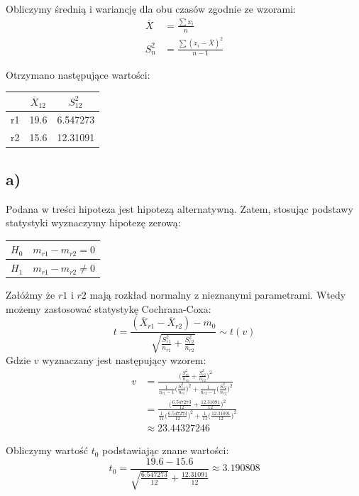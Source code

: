 \documentclass{article}
\begin{document}
Obliczymy średnią i wariancję dla obu czasów zgodnie ze wzorami:
\begin{align*}
\overline{X} & = \frac{\sum x_i}{n} \\
S_n^2 &= \frac{\sum (x_i - \overline{X})^2 }{n-1}
\end{align*}

Otrzymano następujące wartości:
\begin{center} \begin{tabular}{|c|c|c|} \hline
 & $\overline{X}_{12}$ & $S_{12}^2$ \\ \hline
r1 & 19.6 & 6.547273 \\ \hline
r2 & 15.6 & 12.31091 \\ \hline
\end{tabular} \end{center}

\subsection{a)}
Podana w treści hipoteza jest hipotezą alternatywną. Zatem, stosując podstawy statystyki wyznaczymy hipotezę zerową:
\begin{center} \begin{tabular}{|c|c|} \hline
$H_0$ & $m_{r1} - m_{r2} = 0$ \\ \hline
$H_1$ & $m_{r1} - m_{r2} \neq 0$ \\ \hline
\end{tabular} \end{center}

Załóżmy że $r1$ i $r2$ mają rozkład normalny z nieznanymi parametrami. Wtedy możemy zastosować statystykę Cochrana-Coxa:
\[ t = \frac{(\overline{X}_{r1} - \overline{X}_{r2}) - m_0}{\sqrt{ \frac{S_{r1}^2}{n_{r1}} + \frac{S_{r2}^2}{n_{r2}} }} \sim t(v) \]
Gdzie $v$ wyznaczany jest następujący wzorem:
\begin{align*}
v & = \frac{ \Big( \frac{S_{r1}^2}{n_{r1}} + \frac{S_{r2}^2}{n_{r2}} \Big)^2 }{\frac{1}{n_{r1}-1} \Big( \frac{S_{r1}^2}{n_{r1}} \Big)^2 + \frac{1}{n_{r2}-1} \Big( \frac{S_{r2}^2}{n_{r2}} \Big)^2 } \\
& = \frac{ \Big( \frac{6.547273}{12} + \frac{12.31091}{12} \Big)^2 }{\frac{1}{11} \Big( \frac{6.547273}{12} \Big)^2 + \frac{1}{11} \Big( \frac{12.31091}{12} \Big)^2 } \\
& \approx 23.44327246
\end{align*}

Obliczymy wartość $t_0$ podstawiając znane wartości:
\[ t_0 = \frac{19.6 - 15.6}{\sqrt{ \frac{6.547273}{12}} + \frac{12.31091}{12}}  \approx 3.190808 \]
\end{document}
